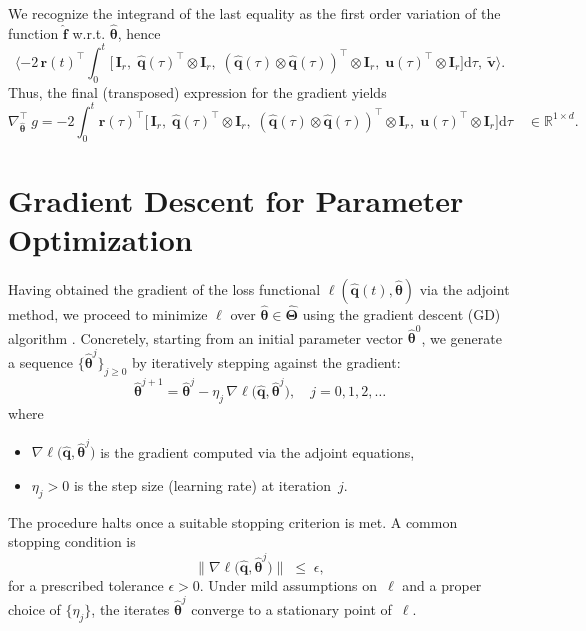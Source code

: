 We recognize the integrand of the last equality as the first order variation of the function $\hat{\mathbf{f}}$ w.r.t. $\hat{\bm{\theta}}$, hence\\
$$\langle-2\,\mathbf{r}(t)^{\!\top}\int_{0}^{t}\bigl[\,\mathbf{I}_r,\;\hat{\mathbf{q}}(\tau)^{\!\top}\otimes\mathbf{I}_r,\;(\hat{\mathbf{q}}(\tau)\otimes\hat{\mathbf{q}}(\tau))^{\!\top}\otimes\mathbf{I}_r,\;\mathbf{u}(\tau)^{\!\top}\otimes\mathbf{I}_r\bigr]\mathrm{d}\tau,~\tilde{\mathbf{v}}\rangle.$$
Thus, the final (transposed) expression for the gradient yields\\
\begin{equation}
    \nabla_{\hat{\bm{\theta}}}^{\top}~g = -2\int_{0}^{t} \mathbf{r}(\tau)^{\!\top}\bigl[\,\mathbf{I}_r,\;\hat{\mathbf{q}}(\tau)^{\!\top}\otimes\mathbf{I}_r,\;(\hat{\mathbf{q}}(\tau)\otimes\hat{\mathbf{q}}(\tau))^{\!\top}\otimes\mathbf{I}_r,\;\mathbf{u}(\tau)^{\!\top}\otimes\mathbf{I}_r\bigr]\mathrm{d}\tau \quad\in\mathbb{R}^{1\times d}.
    \label{eq:gradient_4}
\end{equation}


\section{Gradient Descent for Parameter Optimization}
\label{sec:gd_opt}

Having obtained the gradient of the loss functional $\ell(\hat{\mathbf{q}}(t),\hat{\bm\theta})$ via the adjoint method, we proceed to minimize $\ell$ over $\hat{\bm\theta}\in\hat{\bm{\Theta}}$ using the gradient descent (GD) algorithm \cite{ruder2017overviewgradientdescentoptimization,SENGUPTA2014521}.  Concretely, starting from an initial parameter vector $\hat{\bm\theta}^0$, we generate a sequence $\{\hat{\bm\theta}^j\}_{j\ge0}$ by iteratively stepping against the gradient:\\
\begin{equation}
    \hat{\bm\theta}^{j+1}
    = \hat{\bm\theta}^j
    - \eta_j \,\nabla \ell\bigl(\hat{\mathbf{q}},\hat{\bm\theta}^j\bigr),
    \quad j = 0,1,2,\dots
    \label{eq:gd_update}
\end{equation}
where
\begin{itemize}
  \item $\nabla \ell\bigl(\hat{\mathbf{q}},\hat{\bm\theta}^j\bigr)$ is the gradient computed via the adjoint equations,
  \item $\eta_j>0$ is the step size (learning rate) at iteration~$j$.
\end{itemize}
The procedure halts once a suitable stopping criterion is met. A common stopping condition is\\
\begin{equation}
    \|\nabla \ell\bigl(\hat{\mathbf{q}},\hat{\bm\theta}^j\bigr)\|\;\le\;\epsilon,
    \label{eq:gd_stop}
\end{equation}
for a prescribed tolerance $\epsilon>0$.  Under mild assumptions on~$\ell$ and a proper choice of $\{\eta_j\}$, the iterates $\hat{\bm\theta}^j$ converge to a stationary point of~$\ell$.

